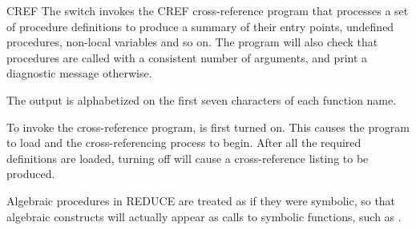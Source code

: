 \begin{Switch}[cref]{CREF}
The switch  invokes the CREF cross-reference program that
processes a set of procedure definitions to produce a summary of their
entry points, undefined procedures, non-local variables and so on.  The
program will also check that procedures are called with a consistent
number of arguments, and print a diagnostic message otherwise.

The output is alphabetized on the first seven characters of each function
name.

To invoke the cross-reference program,  is first turned on.
This causes the program to load and the cross-referencing process to
begin.  After all the required definitions are loaded, turning 
off will cause a cross-reference listing to be produced.

\begin{Comments}

Algebraic procedures in REDUCE are treated as if they were symbolic, so
that algebraic constructs will actually appear as calls to symbolic
functions, such as .
\end{Comments}

\end{Switch}


